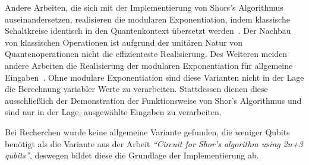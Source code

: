 Andere Arbeiten, die sich mit der Implementierung von Shors's Algorithmus auseinandersetzen,
realisieren die modularen Exponentiation, 
indem klassische Schaltkreise identisch in den Quantenkontext übersetzt werden~\cite{Vedral_1996}.
Der Nachbau von klassischen Operationen ist aufgrund der unitären Natur von Quantenoperationen nicht die effizienteste Realisierung.
Des Weiteren meiden andere Arbeiten die Realisierung der modularen Exponentiation für allgemeine Eingaben~\cite{9376169,9686492}. 
Ohne modulare Exponentiation sind diese Varianten nicht in der Lage die Berechnung variabler Werte zu verarbeiten.
Stattdessen dienen diese ausschließlich der Demonstration der Funktionsweise von Shor's Algorithmus und
sind nur in der Lage, ausgewählte Eingaben zu verarbeiten.

Bei Recherchen wurde keine allgemeine Variante gefunden,
die weniger Qubits benötigt als die Variante aus der Arbeit \textit{"`Circuit for Shor’s algorithm using 2n+3 qubits"'},
deswegen bildet diese die Grundlage der Implementierung ab.
















